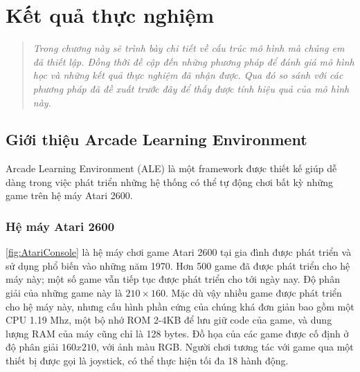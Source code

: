 \chapter{Kết quả thực nghiệm}
\ifpdf
\graphicspath{{Chapter4/Chapter4Figs/PNG/}{Chapter4/Chapter4Figs/PDF/}{Chapter4/Chapter4Figs/}}
\else
\graphicspath{{Chapter4/Chapter4Figs/EPS/}{Chapter4/Chapter4Figs/}}
\fi
\begin{quote}
	\textit{Trong chương này sẽ trình bày chi tiết về cấu trúc mô hình mà chúng em đã thiết lập. Đồng thời đề cập đến những phương pháp để đánh giá mô hình học và những kết quả thực nghiệm đã nhận được. Qua đó so sánh với các phương pháp đã đề xuất trước đây để thấy được tính hiệu quả của mô hình này.}
\end{quote}
 
\section{Giới thiệu Arcade Learning Environment}
Arcade Learning Environment (ALE) là một framework được thiết kế giúp dễ dàng trong việc phát triển những hệ thống có thể tự động chơi bất kỳ những game trên hệ máy Atari 2600.
\subsection{Hệ máy Atari 2600}
\ref{fig:AtariConsole} là hệ máy chơi game Atari 2600 tại gia đình được phát triển và sử dụng phổ biến vào những năm 1970.
Hơn 500 game đã được phát triển cho hệ máy này; một số game vẫn tiếp tục được phát triển cho tới ngày nay. Độ phân giải của những game này là $210 \times 160$. Mặc dù vậy nhiều game được phát triển cho hệ máy này, nhưng cấu hình phần cứng của chúng khá đơn giản bao gồm một CPU 1.19 Mhz, một bộ nhớ ROM 2-4KB để lưu giữ code của game, và dung lượng RAM của máy cũng chỉ là 128 bytes. Đồ họa của các game được cố định ở độ phân giải $160 x 210$, với ảnh màu RGB. Người chơi tương tác với game qua một thiết bị được gọi là joystick, có thể thực hiện tối đa 18 hành động.

